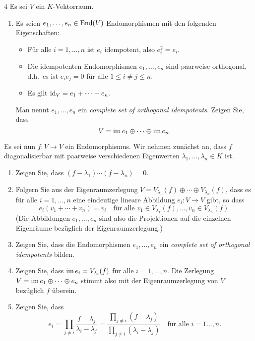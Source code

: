 \begin{question}[subtitle = Ein Kriterium für Diagonalisierbarkeit mithilfe von complete sets of orthogonal idempotents]{4}
  Es sei $V$ ein $K$-Vektorraum.
  \begin{enumerate}[leftmargin=*]
    \item
      Es seien $e_1, \dotsc, e_n \in \operatorname{End}(V)$ Endomorphismen mit den folgenden Eigenschaften:
      \begin{itemize}
        \item
          Für alle $i = 1, \dotsc, n$ ist $e_i$ idempotent, also $e_i^2 = e_i$.
        \item
          Die idempotenten Endomorphismen $e_1, \dotsc, e_n$ sind paarweise orthogonal, d.h.\ es ist $e_i e_j = 0$ für alle $1 \leq i \neq j \leq n$.
        \item
          Es gilt $\operatorname{id}_V = e_1 + \dotsb + e_n$.
      \end{itemize}
      Man nennt $e_1, \dotsc, e_n$ ein \emph{complete set of orthogonal idempotents}.
      Zeigen Sie, dass
      \[
        V = \operatorname{im} e_1 \oplus \dotsb \oplus \operatorname{im} e_n.
      \]
  \end{enumerate}
  Es sei nun $f \colon V \to V$ ein Endomorphismus.
  Wir nehmen zunächst an, dass $f$ diagonalisierbar mit paarweise verschiedenen Eigenwerten $\lambda_1, \dotsc, \lambda_n \in K$ ist.
  \begin{enumerate}[resume]
    \item
      Zeigen Sie, dass $(f - \lambda_1) \dotsm (f - \lambda_n) = 0$.
    \item
      Folgern Sie aus der Eigenraumzerlegung $V = V_{\lambda_1}(f) \oplus \dotsb \oplus V_{\lambda_n}(f)$, dass es für alle $i = 1, \dotsc, n$ eine eindeutige lineare Abbildung $e_i \colon V \to V$ gibt, so dass
      \[
          e_i(v_1 + \dotsb + v_n)
        = v_i
        \quad
        \text{für alle $v_1 \in V_{\lambda_1}(f), \dotsc, v_n \in V_{\lambda_n}(f)$}.
      \]
      (Die Abbildungen $e_1, \dotsc, e_n$ sind also die Projektionen auf die einzelnen Eigenräume bezüglich der Eigenraumzerlegung.)
    \item
      Zeigen Sie, dass die Endomorphismen $e_1, \dotsc, e_n$ ein \emph{complete set of orthogonal idempotents} bilden.
    \item
      Zeigen Sie, dass $\operatorname{im} e_i = V_{\lambda_i}(f)$ für alle $i = 1, \dotsc, n$.
      Die Zerlegung $V = \operatorname{im} e_1 \oplus \dotsb \oplus e_n$ stimmt also mit der Eigenraumzerlegung von $V$ bezüglich $f$ überein.
    \item
      Zeigen Sie, dass
      \[
          e_i
        = \prod_{j \neq i} \frac{f - \lambda_j}{\lambda_i - \lambda_j}
        = \frac{\prod_{j \neq i} (f-\lambda_j)}{\prod_{j \neq i} (\lambda_i - \lambda_j)}
        \quad
        \text{für alle $i = 1 \dotsc, n$}.
      \]
      

\end{enumerate}
\end{question}
